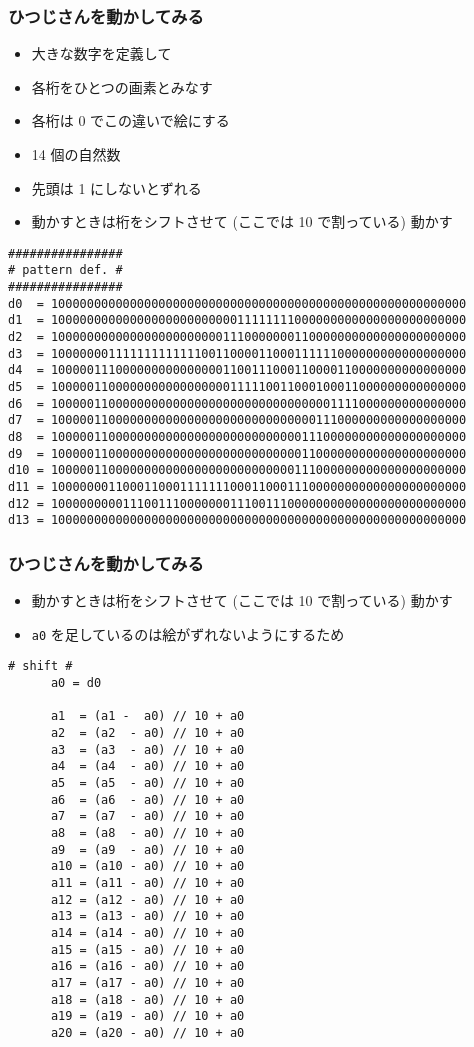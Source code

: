 \begin{frame}
\frametitle{ひつじさんを動かしてみる}
  \begin{itemize}
\scriptsize
\item 大きな数字を定義して
\item 各桁をひとつの画素とみなす
\item 各桁は 0 でこの違いで絵にする
\item 14 個の自然数
\item 先頭は 1 にしないとずれる
\item 動かすときは桁をシフトさせて (ここでは 10 で割っている) 動かす
  \end{itemize}
  \begin{lstlisting}[caption={sheep.py (declaration)},label=sheep-data]
################
# pattern def. #
################
d0  = 1000000000000000000000000000000000000000000000000000000000
d1  = 1000000000000000000000000011111111000000000000000000000000
d2  = 1000000000000000000000001110000000110000000000000000000000
d3  = 1000000011111111111110011000011000111111000000000000000000
d4  = 1000001110000000000000001100111000110000110000000000000000
d5  = 1000001100000000000000000111110011000100011000000000000000
d6  = 1000001100000000000000000000000000000001111000000000000000
d7  = 1000001100000000000000000000000000000111000000000000000000
d8  = 1000001100000000000000000000000000011100000000000000000000
d9  = 1000001100000000000000000000000000011000000000000000000000
d10 = 1000001100000000000000000000000000111000000000000000000000
d11 = 1000000011000110001111111000110001110000000000000000000000
d12 = 1000000000111001110000000111001110000000000000000000000000
d13 = 1000000000000000000000000000000000000000000000000000000000
  \end{lstlisting}
\end{frame}
\begin{frame}
\frametitle{ひつじさんを動かしてみる}
  \begin{itemize}
\scriptsize
\item 動かすときは桁をシフトさせて (ここでは 10 で割っている) 動かす
\item {\tt a0} を足しているのは絵がずれないようにするため
  \end{itemize}
  \begin{lstlisting}[caption={sheep.py (shift)},label=sheep-shift,firstnumber=last]
      # shift #
      a0 = d0

      a1  = (a1 -  a0) // 10 + a0
      a2  = (a2  - a0) // 10 + a0
      a3  = (a3  - a0) // 10 + a0
      a4  = (a4  - a0) // 10 + a0
      a5  = (a5  - a0) // 10 + a0
      a6  = (a6  - a0) // 10 + a0
      a7  = (a7  - a0) // 10 + a0
      a8  = (a8  - a0) // 10 + a0
      a9  = (a9  - a0) // 10 + a0
      a10 = (a10 - a0) // 10 + a0
      a11 = (a11 - a0) // 10 + a0
      a12 = (a12 - a0) // 10 + a0
      a13 = (a13 - a0) // 10 + a0
      a14 = (a14 - a0) // 10 + a0
      a15 = (a15 - a0) // 10 + a0
      a16 = (a16 - a0) // 10 + a0
      a17 = (a17 - a0) // 10 + a0
      a18 = (a18 - a0) // 10 + a0
      a19 = (a19 - a0) // 10 + a0
      a20 = (a20 - a0) // 10 + a0
  \end{lstlisting}
\end{frame}
